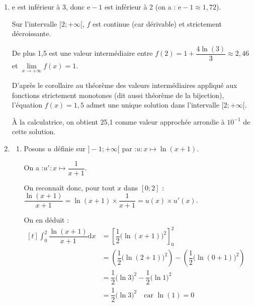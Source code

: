\documentclass[10pt]{article}
\providecommand{\e}{{\mathrm{e}}}
\renewcommand{\d}{{\mathrm{d}}}
\begin{document}
\begin{enumerate}
		On a donc le tableau de variation complet de la fonction $f$ :

		\begin{center}
		\end{center}

		\item $\e$ est inférieur à 3, donc $\e - 1$ est inférieur à 2 (on a : $\e - 1 \approx 1,72$).

		Sur l'intervalle $[2 ; +\infty[$, $f$ est continue (car dérivable) et strictement décroissante.

		De plus 1,5 est une valeur intermédiaire entre \quad $f(2) = 1 + \dfrac{4\ln(3)}{3} \approx 2,46$ \quad et \quad$\lim\limits_{x \to +\infty} f(x) = 1$.

		D'après le corollaire au théorème des valeurs intermédiaires appliqué aux fonctions strictement monotones (dit aussi théorème de la bijection), l'équation \quad $f(x)=1,5$ \quad admet une unique solution dans l'intervalle $[2 ; +\infty[$.

		À la calculatrice, on obtient 25,1 comme valeur approchée arrondie à $10^{-1}$ de cette solution.

		\item \begin{enumerate}
			\item Posons $u$ définie sur $]-1 ; +\infty[$ par :\quad $u : x \longmapsto \ln(x+1)$.

			On a :\quad $u' : x \longmapsto \dfrac{1}{x+1}$.

			On reconnaît donc, pour tout $x$ dans $[0 ; 2]$ :\quad $\dfrac{\ln(x+1)}{x+1} = \ln(x+1) \times \dfrac{1}{x+1} = u(x) \times u'(x)$.

			On en déduit :
			$\begin{aligned}[t]
				\int_{0}^{2} \dfrac{\ln (x+1)}{x+1} \d{}x
					&= \left[\dfrac{1}{2}\big(\ln(x+1)\big)^2\right]_{0}^{2}\\
					&= \left(\dfrac{1}{2}\big(\ln(2+1)\big)^2\right) - \left(\dfrac{1}{2}\big(\ln(0+1)\big)^2\right)\\
					&= \dfrac{1}{2}\big(\ln 3\big)^{2} - \dfrac{1}{2}\big(\ln 1\big)^{2}\\
					&=\dfrac{1}{2}\big(\ln 3\big)^{2} \quad \text{car } \ln(1) = 0
			\end{aligned}$


\end{enumerate}
\end{enumerate}
\end{document}
